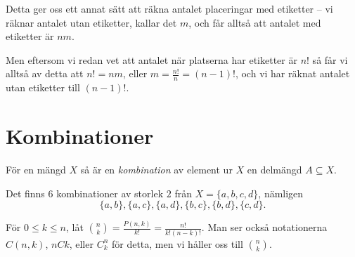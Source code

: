 \documentclass{tufte-handout}
\begin{document}
\begin{example}
	Detta ger oss ett annat sätt att räkna antalet placeringar med etiketter -- vi räknar antalet utan etiketter, kallar det $m$, och får alltså att antalet med etiketter är $nm$.

	Men eftersom vi redan vet att antalet när platserna har etiketter är $n!$ så får vi alltså av detta att $n! = nm$, eller $m = \frac{n!}{n} = (n-1)!$, och vi har räknat antalet utan etiketter till $(n-1)!$.
\end{example}

\section{Kombinationer}

\begin{definition}
	För en mängd $X$ så är en \emph{kombination} av element ur $X$ en delmängd $A \subseteq X$.
\end{definition}

\begin{example}
	Det finns $6$ kombinationer av storlek $2$ från $X = \{a,b,c,d\}$, nämligen
	$$\{a,b\}, \{a,c\},\{a,d\},\{b,c\},\{b,d\},\{c,d\}.$$
\end{example}

\begin{definition}
	För $0 \leq k \leq n$, låt $\binom{n}{k} = \frac{P(n,k)}{k!} = \frac{n!}{k!(n-k)!}$. Man ser också notationerna $C(n,k)$, $nCk$, eller $C^n_k$ för detta, men vi håller oss till $\binom{n}{k}$. 
\end{definition}
\end{document}
